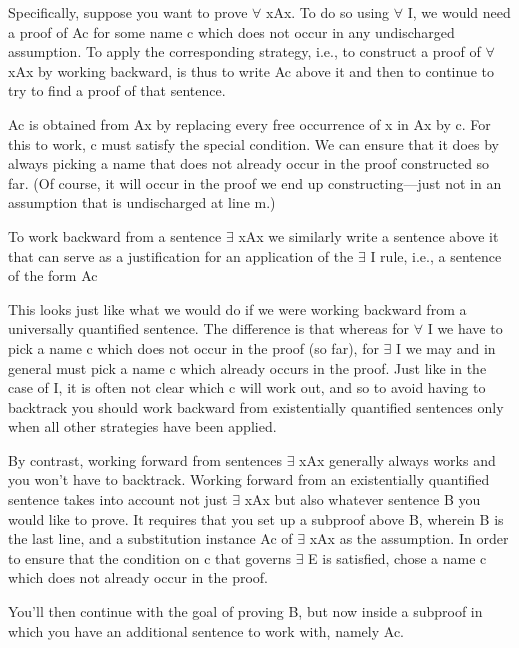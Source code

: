 Specifically, suppose you want to prove $\forall$ xAx. To do so using $\forall$ I, we would need a proof of Ac for some name c which does not occur in any undischarged assumption. To apply the corresponding strategy, i.e., to construct a proof of $\forall$ xAx by working backward, is thus to write Ac above it and then to continue to try to find a proof of that sentence.
\begin{fitchproof}
\ellipsesline					
{}			
\end{fitchproof}
Ac is obtained from Ax by replacing every free occurrence of x in Ax by c. For this to work, c must satisfy the special condition. We can ensure that it does by always picking a name that does not already occur in the proof constructed so far. (Of course, it will occur in the proof we end up constructing—just not in an assumption that is undischarged at line m.)

To work backward from a sentence $\exists$ xAx we similarly write a sentence above it that can serve as a justification for an application of the $\exists$ I rule, i.e., a sentence of the form Ac
\begin{fitchproof}
\ellipsesline
{}
\end{fitchproof}

This looks just like what we would do if we were working backward from a universally quantified sentence. The difference is that whereas for $\forall$ I we have to pick a name c which does not occur in the proof (so far), for $\exists$ I we may and in general must pick a name c which already occurs in the proof. Just like in the case of \eor I, it is often not clear which c will work out, and so to avoid having to backtrack you should work backward from existentially quantified sentences only when all other strategies have been applied.

By contrast, working forward from sentences $\exists$ xAx generally always works and you won’t have to backtrack. Working forward from an existentially quantified sentence takes into account not just $\exists$ xAx but also whatever sentence B you would like to prove. It requires that you set up a subproof above B, wherein B is the last line, and a substitution instance Ac of $\exists$ xAx as the assumption. In order to ensure that the condition on c that governs $\exists$ E is satisfied, chose a name c which does not already occur in the proof.
\begin{fitchproof}
\ellipsesline
{}				
\ellipsesline
{}		
\open
{}
\close
{}	
\end{fitchproof}
You’ll then continue with the goal of proving B, but now inside a subproof in which you have an additional sentence to work with, namely Ac.

